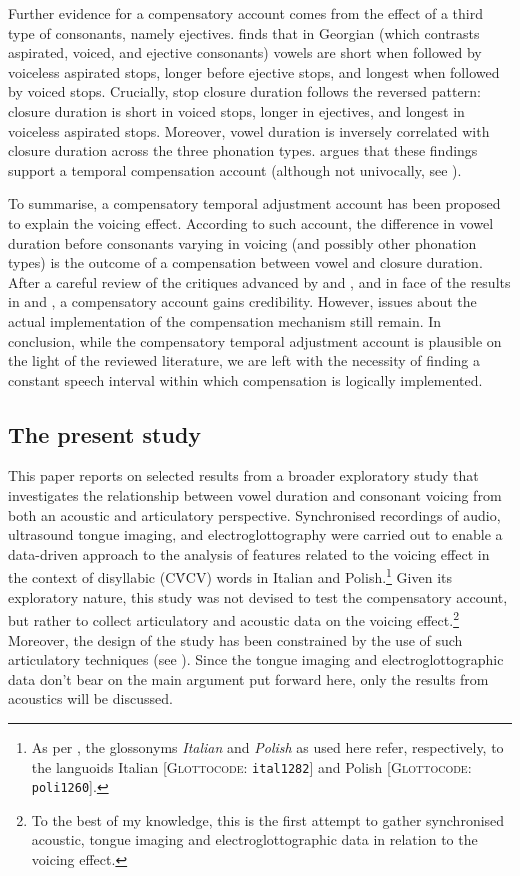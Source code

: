 \documentclass[preprint]{JASAnew}
\begin{document}
Further evidence for a compensatory account comes from the effect of a
third type of consonants, namely ejectives. \citet{begus2017} finds that
in Georgian (which contrasts aspirated, voiced, and ejective consonants)
vowels are short when followed by voiceless aspirated stops, longer
before ejective stops, and longest when followed by voiced stops.
Crucially, stop closure duration follows the reversed pattern: closure
duration is short in voiced stops, longer in ejectives, and longest in
voiceless aspirated stops. Moreover, vowel duration is inversely
correlated with closure duration across the three phonation types.
\citet{begus2017} argues that these findings support a temporal
compensation account (although not univocally, see
\citealt[Section V]{begus2017}).

To summarise, a compensatory temporal adjustment account has been
proposed to explain the voicing effect. According to such account, the
difference in vowel duration before consonants varying in voicing (and
possibly other phonation types) is the outcome of a compensation between
vowel and closure duration. After a careful review of the critiques
advanced by \citet{chen1970} and \citet{maddieson1976}, and in face of
the results in \citet{slis1969} and \citet{begus2017}, a compensatory
account gains credibility. However, issues about the actual
implementation of the compensation mechanism still remain. In
conclusion, while the compensatory temporal adjustment account is
plausible on the light of the reviewed literature, we are left with the
necessity of finding a constant speech interval within which
compensation is logically implemented.

\hypertarget{the-present-study}{%
\subsection{The present study}\label{the-present-study}}

This paper reports on selected results from a broader exploratory study
that investigates the relationship between vowel duration and consonant
voicing from both an acoustic and articulatory perspective. Synchronised
recordings of audio, ultrasound tongue imaging, and electroglottography
were carried out to enable a data-driven approach to the analysis of
features related to the voicing effect in the context of disyllabic
(CV́CV) words in Italian and
Polish.\footnote{As per \citet{cysouw2013}, the glossonyms \textit{Italian} and \textit{Polish} as used here refer, respectively, to the languoids Italian [\textsc{Glottocode}: \texttt{ital1282}] and Polish [\textsc{Glottocode}: \texttt{poli1260}].}
Given its exploratory nature, this study was not devised to test the
compensatory account, but rather to collect articulatory and acoustic
data on the voicing
effect.\footnote{To the best of my knowledge, this is the first attempt to gather synchronised acoustic, tongue imaging and electroglottographic data in relation to the voicing effect.}
Moreover, the design of the study has been constrained by the use of
such articulatory techniques (see ). Since the tongue
imaging and electroglottographic data don't bear on the main argument
put forward here, only the results from acoustics will be discussed.
\end{document}
